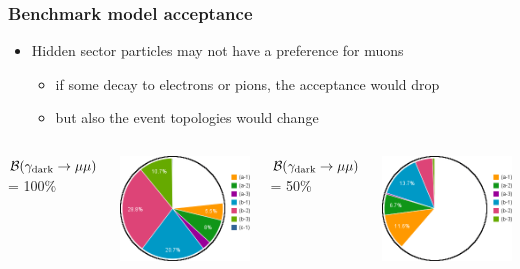 \documentclass[compress]{beamer}
\newcommand{\s}[1]{{\mbox{\scriptsize #1}}}
\begin{document}
\begin{frame}
\frametitle{Benchmark model acceptance}

\begin{itemize}
\item Hidden sector particles may not have a preference for muons
\begin{itemize}
\item if some decay to electrons or pions, the acceptance would drop
\item but also the event topologies would change
\end{itemize}
\end{itemize}

\vspace{0.5 cm}
\begin{columns}
\centering $\mathcal{B}(\gamma_\s{dark} \to \mu\mu)$ = 100\%

\vspace{0.2 cm}
\includegraphics[width=0.9\linewidth]{chart2d_Br100.png}

\centering $\mathcal{B}(\gamma_\s{dark} \to \mu\mu)$ = 50\%

\vspace{0.2 cm}
\includegraphics[width=0.9\linewidth]{chart2d_Br50.png}


\end{columns}
\end{frame}
\end{document}
